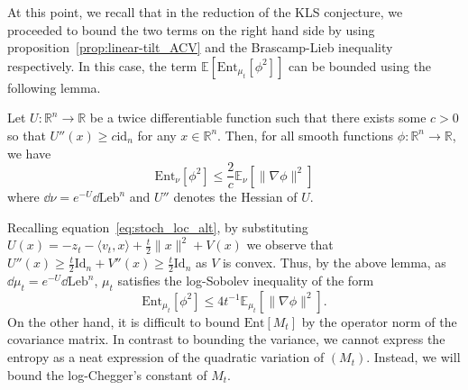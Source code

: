 At this point, we recall that in the reduction of the KLS conjecture, we proceeded to bound the two terms on the 
right hand side by using proposition~\ref{prop:linear-tilt_ACV} and the Brascamp-Lieb inequality respectively. 
In this case, the term \(\mathbb{E}[\text{Ent}_{\mu_t}[\phi^2]]\) can be bounded using the following lemma.

\begin{lemma}
  Let \(U : \mathbb{R}^n \to \mathbb{R}\) be a twice differentiable function such that
  there exists some \(c > 0\) so that \(U''(x) \ge c\text{id}_n\) for any \(x \in \mathbb{R}^n\). 
  Then, for all smooth functions
  \(\phi : \mathbb{R}^n \to \mathbb{R}\), we have 
  \[\text{Ent}_\nu[\phi^2] \le \frac{2}{c}\mathbb{E}_\nu[\|\nabla\phi\|^2]\]
  where \(\dd \nu = e^{-U} \dd \text{Leb}^n\) and \(U''\) denotes the Hessian of \(U\).
\end{lemma}

Recalling equation~\eqref{eq:stoch_loc_alt}, by substituting \(U(x) = - z_t - \langle v_t, x\rangle + \frac{t}{2}\|x\|^2 + V(x)\)
we observe that \(U''(x) \ge \frac{t}{2}\text{Id}_n + V''(x) \ge \frac{t}{2}\text{Id}_n\) as \(V\) is convex.
Thus, by the above lemma, as \(\dd \mu_t = e^{-U} \dd \text{Leb}^n\), \(\mu_t\) satisfies the log-Sobolev 
inequality of the form
\begin{equation}
  \text{Ent}_{\mu_t}[\phi^2] \le 4t^{-1} \mathbb{E}_{\mu_t}[\|\nabla \phi\|^2].
\end{equation} 
On the other hand, it is difficult to bound \(\text{Ent}[M_t]\) by the operator norm of the covariance 
matrix. In contrast to bounding the variance, we cannot express the entropy as a neat expression of 
the quadratic variation of \((M_t)\). Instead, we will bound the log-Chegger's constant of \(M_t\).

